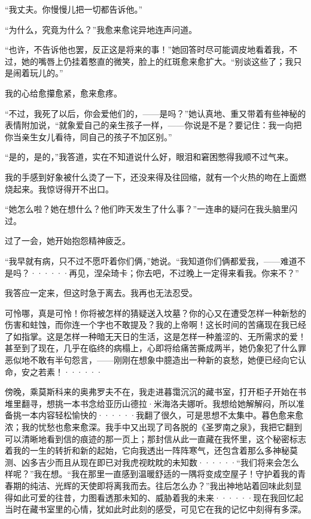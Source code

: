 \documentclass[12pt, UTF8]{ctexbook}
\begin{document}
\par “我丈夫。你慢慢儿把一切都告诉他。”
\par “为什么，究竟为什么？”我愈来愈诧异地连声问道。
\par “也许，不告诉他也罢，反正这是将来的事！”她回答时尽可能调皮地看着我，不过，她的嘴唇上仍挂着憨直的微笑，脸上的红斑愈来愈扩大。“别谈这些了；我只是闹着玩儿的。”
\par 我的心给愈攥愈紧，愈来愈疼。
\par “不过，我死了以后，你会爱他们的，——是吗？”她认真地、重又带着有些神秘的表情附加说，“就象爱自己的亲生孩子一样，——你说是不是？要记住：我一向把你当亲生女儿看待，同自己的孩子不加区别。”
\par “是的，是的，”我答道，实在不知道说什么好，眼泪和窘困憋得我顺不过气来。
\par 我的手感到好象被什么烫了一下，还没来得及往回缩，就有一个火热的吻在上面燃烧起来。我惊讶得开不出口。
\par “她怎么啦？她在想什么？他们昨天发生了什么事？”一连串的疑问在我头脑里闪过。
\par 过了一会，她开始抱怨精神疲乏。
\par “我早就有病，只不过不愿吓着你们俩，”她说。“我知道你们俩都爱我，——难道不是吗？······再见，涅朵琦卡；你去吧，不过晚上一定得来看我。你来不？”
\par 我答应一定来，但这时急于离去。我再也无法忍受。
\par 可怜哪，真是可怜！你将被怎样的猜疑送入坟墓？你的心又在遭受怎样一种新愁的伤害和蛀蚀，而你连一个字也不敢提及？我的上帝啊！这长时间的苦痛现在我已经了如指掌。这是怎样一种暗无天日的生活，这是怎样一种羞涩的、无所需求的爱！甚至到了现在，几乎在临终的病榻上，心即将给痛苦撕成两半，她仍象犯了什么罪恶似地不敢有半句怨言，——刚刚在想象中臆造出一种新的哀愁，她便已经向它认命，安之若素！······
\par 傍晚，乘莫斯科来的奥弗罗夫不在，我走进暮霭沉沉的藏书室，打开柜子开始在书堆里翻寻，想挑一本书念给亚历山德拉·米海洛夫娜听。我想给她解解闷，所以准备挑一本内容轻松愉快的······我翻了很久，可是思想不太集中。暮色愈来愈浓；我的忧愁也愈来愈深。我手中又出现了司各脱的《圣罗南之泉》，我把它翻到可以清晰地看到信的痕迹的那一页上；那封信从此一直藏在我怀里，这个秘密标志着我的一生的转折和新的起始，它向我透出一阵阵寒气，还包含着那么多神秘莫测、凶多吉少而且从现在即已对我虎视眈眈的未知数······“我们将来会怎么样呢？”我在想。“我在那里一直感到温暖舒适的一隅将变成空屋子！守护着我的青春期的纯洁、光辉的天使即将离我而去。往后怎么办？”我出神地站着回味此刻显得如此可爱的往昔，力图看透那未知的、威胁着我的未来······现在我回忆起当时在藏书室里的心情，犹如此时此刻的感受，可见它在我的记忆中刻得有多深。
\end{document}
